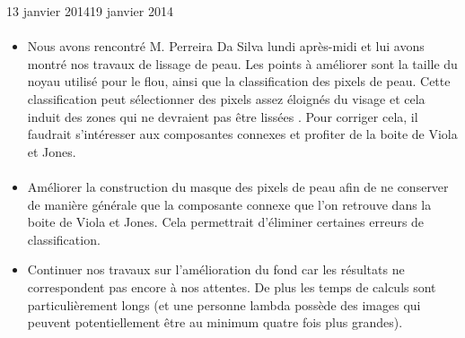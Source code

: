 \documentclass[12pt]{fiche-rd-info}
\begin{document}
\begin{fichesuivi}{13 janvier 2014}{19 janvier 2014}
\paragraph{}
	\begin{echange}
		\begin{itemize}
			\item Nous avons rencontré M. Perreira Da Silva lundi après-midi et lui avons montré nos travaux de lissage de peau. Les points à améliorer sont la taille du noyau utilisé pour le flou, ainsi que la classification des pixels de peau. Cette classification peut sélectionner des pixels assez éloignés du visage et cela induit des zones qui ne devraient pas être lissées . Pour corriger cela, il faudrait s'intéresser aux composantes connexes et profiter de la boite de Viola et Jones.
		\end{itemize}
	\end{echange}


\paragraph*{}
	\begin{planification}
		\begin{itemize}
			\item Améliorer la construction du masque des pixels de peau afin de ne conserver de manière générale que la composante connexe que l'on retrouve dans la boite de Viola et Jones. Cela permettrait d'éliminer certaines erreurs de classification.
			\item Continuer nos travaux sur l'amélioration du fond car les résultats ne correspondent pas encore à nos attentes. De plus les temps de calculs sont particulièrement longs (et une personne lambda possède des images qui peuvent potentiellement être au minimum quatre fois plus grandes).	
\end{itemize}
	\end{planification}
\end{fichesuivi}
\end{document}

